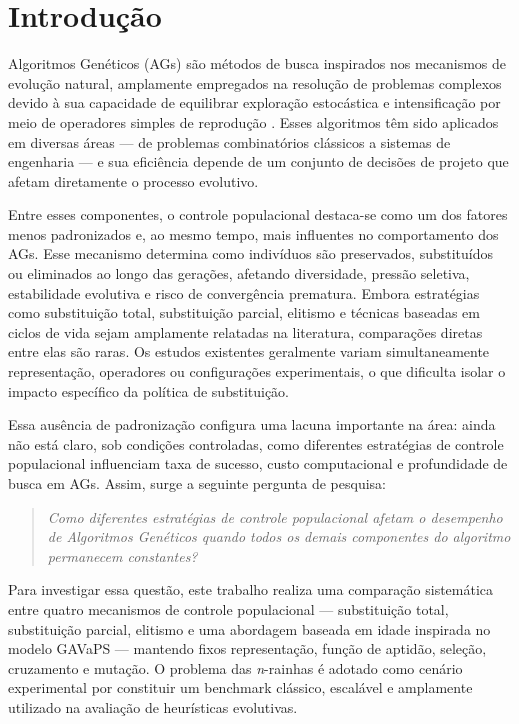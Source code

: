 \section{Introdução}

Algoritmos Genéticos (AGs) são métodos de busca inspirados nos mecanismos de evolução natural, amplamente empregados na resolução de problemas complexos devido à sua capacidade de equilibrar exploração estocástica e intensificação por meio de operadores simples de reprodução \cite{eiben2015introduction, holland1975adaptation}. Esses algoritmos têm sido aplicados em diversas áreas — de problemas combinatórios clássicos a sistemas de engenharia — e sua eficiência depende de um conjunto de decisões de projeto que afetam diretamente o processo evolutivo.

Entre esses componentes, o controle populacional destaca-se como um dos fatores menos padronizados e, ao mesmo tempo, mais influentes no comportamento dos AGs. Esse mecanismo determina como indivíduos são preservados, substituídos ou eliminados ao longo das gerações, afetando diversidade, pressão seletiva, estabilidade evolutiva e risco de convergência prematura. Embora estratégias como substituição total, substituição parcial, elitismo e técnicas baseadas em ciclos de vida sejam amplamente relatadas na literatura, comparações diretas entre elas são raras. Os estudos existentes geralmente variam simultaneamente representação, operadores ou configurações experimentais, o que dificulta isolar o impacto específico da política de substituição.

Essa ausência de padronização configura uma lacuna importante na área: ainda não está claro, sob condições controladas, como diferentes estratégias de controle populacional influenciam taxa de sucesso, custo computacional e profundidade de busca em AGs. Assim, surge a seguinte pergunta de pesquisa:

\begin{quote}
\centering
\textit{Como diferentes estratégias de controle populacional afetam o desempenho de Algoritmos Genéticos quando todos os demais componentes do algoritmo permanecem constantes?}
\end{quote}

Para investigar essa questão, este trabalho realiza uma comparação sistemática entre quatro mecanismos de controle populacional — substituição total, substituição parcial, elitismo e uma abordagem baseada em idade inspirada no modelo GAVaPS — mantendo fixos representação, função de aptidão, seleção, cruzamento e mutação. O problema das \textit{n}-rainhas é adotado como cenário experimental por constituir um benchmark clássico, escalável e amplamente utilizado na avaliação de heurísticas evolutivas.

